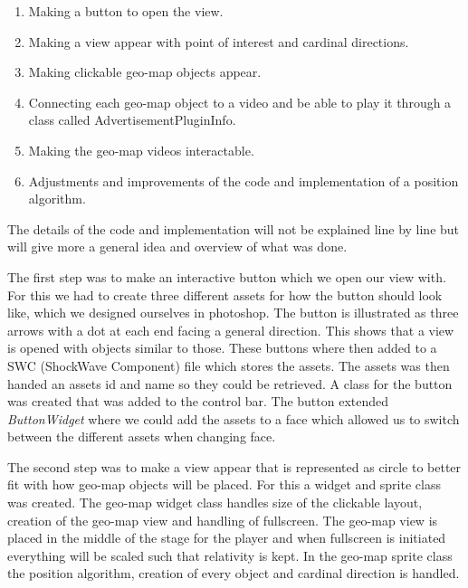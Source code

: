 \documentclass[9pt,a4paper]{acmproc}
\begin{document}
\begin{enumerate}
\item Making a button to open the view.

\item Making a view appear with point of interest and cardinal directions.

\item Making clickable geo-map objects appear.

\item Connecting each geo-map object to a video and be able to play it through a class called AdvertisementPluginInfo.

\item Making the geo-map videos interactable.


\item Adjustments and improvements of the code and implementation of a position algorithm. 
\end{enumerate}

The details of the code and implementation will not be explained line by line but will give more a general idea and overview of what was done.

The first step was to make an interactive button which we open our view with. For this we had to create three different assets for how the button should look like, which we designed ourselves in photoshop. The button is illustrated as three arrows with a dot at each end facing a general direction. This shows that a view is opened with objects similar to those. These buttons where then added to a SWC (ShockWave Component) file which stores the assets. The assets was then handed an assets id and name so they could be retrieved. A class for the button was created that was added to the control bar. The button extended \textit{ButtonWidget} where we could add the assets to a face which allowed us to switch between the different assets when changing face. 

The second step was to make a view appear that is represented as circle to better fit with how geo-map objects will be placed. For this a widget and sprite class was created. The geo-map widget class handles size of the clickable layout, creation of the geo-map view and handling of fullscreen. The geo-map view is placed in the middle of the stage for the player and when fullscreen is initiated everything will be scaled such that relativity is kept. In the geo-map sprite class the position algorithm, creation of every object and cardinal direction is handled.
\end{document}
